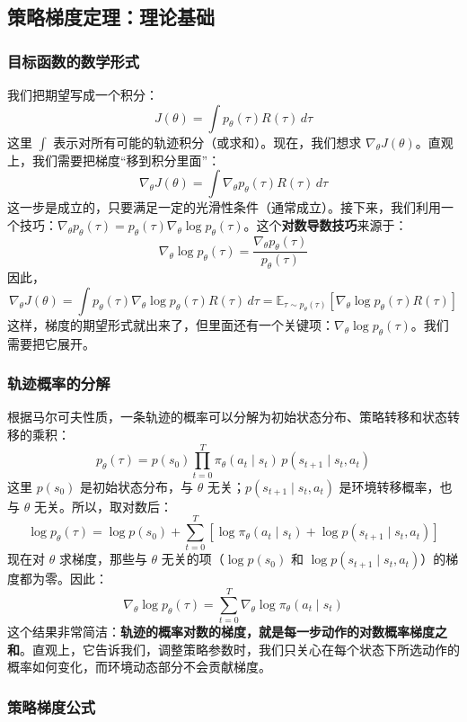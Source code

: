 \documentclass[lang=cn,zihao=-4,a4paper,fontset=windows]{beautybook}
\begin{document}
\subsection{策略梯度定理：理论基础}

\subsubsection{目标函数的数学形式}

我们把期望写成一个积分：
\[
J(\theta) = \int p_\theta(\tau) R(\tau) \, d\tau
\]
这里 \(\int\) 表示对所有可能的轨迹积分（或求和）。现在，我们想求 \(\nabla_\theta J(\theta)\)。直观上，我们需要把梯度“移到积分里面”：
\[
\nabla_\theta J(\theta) = \int \nabla_\theta p_\theta(\tau) R(\tau) \, d\tau
\]
这一步是成立的，只要满足一定的光滑性条件（通常成立）。接下来，我们利用一个技巧：\(\nabla_\theta p_\theta(\tau) = p_\theta(\tau) \nabla_\theta \log p_\theta(\tau)\)。这个\textbf{对数导数技巧}来源于：
\[
\nabla_\theta \log p_\theta(\tau) = \frac{\nabla_\theta p_\theta(\tau)}{p_\theta(\tau)}
\]
因此，
\[
\nabla_\theta J(\theta) = \int p_\theta(\tau) \nabla_\theta \log p_\theta(\tau) R(\tau) \, d\tau = \mathbb{E}_{\tau \sim p_\theta(\tau)} \left[ \nabla_\theta \log p_\theta(\tau) R(\tau) \right]
\]
这样，梯度的期望形式就出来了，但里面还有一个关键项：\(\nabla_\theta \log p_\theta(\tau)\)。我们需要把它展开。

\subsubsection{轨迹概率的分解}

根据马尔可夫性质，一条轨迹的概率可以分解为初始状态分布、策略转移和状态转移的乘积：
\[
p_\theta(\tau) = p(s_0) \prod_{t=0}^{T} \pi_\theta(a_t \mid s_t) \, p(s_{t+1} \mid s_t, a_t)
\]
这里 \(p(s_0)\) 是初始状态分布，与 \(\theta\) 无关；\(p(s_{t+1} \mid s_t, a_t)\) 是环境转移概率，也与 \(\theta\) 无关。所以，取对数后：
\[
\log p_\theta(\tau) = \log p(s_0) + \sum_{t=0}^{T} \left[ \log \pi_\theta(a_t \mid s_t) + \log p(s_{t+1} \mid s_t, a_t) \right]
\]
现在对 \(\theta\) 求梯度，那些与 \(\theta\) 无关的项（\(\log p(s_0)\) 和 \(\log p(s_{t+1} \mid s_t, a_t)\)）的梯度都为零。因此：
\[
\nabla_\theta \log p_\theta(\tau) = \sum_{t=0}^{T} \nabla_\theta \log \pi_\theta(a_t \mid s_t)
\]
这个结果非常简洁：\textbf{轨迹的概率对数的梯度，就是每一步动作的对数概率梯度之和}。直观上，它告诉我们，调整策略参数时，我们只关心在每个状态下所选动作的概率如何变化，而环境动态部分不会贡献梯度。

\subsubsection{策略梯度公式}
\end{document}
